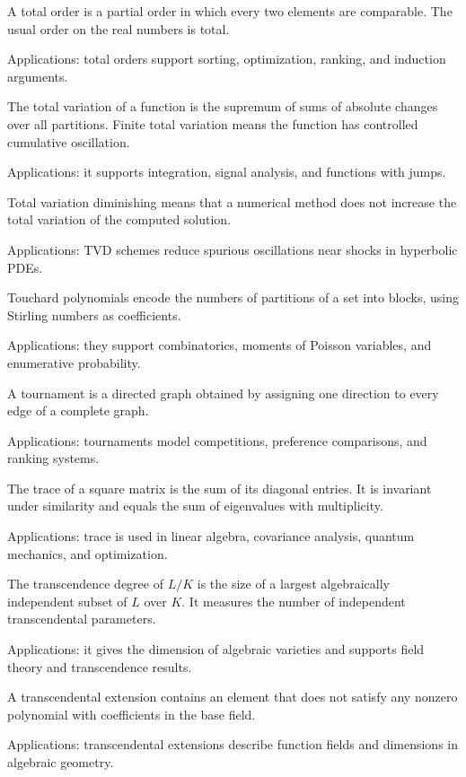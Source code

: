 A total order is a partial order in which every two elements are comparable. The usual order on the real numbers is total. \par\noindent Applications: total orders support sorting, optimization, ranking, and induction arguments.

The total variation of a function is the supremum of sums of absolute changes over all partitions. Finite total variation means the function has controlled cumulative oscillation. \par\noindent Applications: it supports integration, signal analysis, and functions with jumps.

Total variation diminishing means that a numerical method does not increase the total variation of the computed solution. \par\noindent Applications: TVD schemes reduce spurious oscillations near shocks in hyperbolic PDEs.

Touchard polynomials encode the numbers of partitions of a set into blocks, using Stirling numbers as coefficients. \par\noindent Applications: they support combinatorics, moments of Poisson variables, and enumerative probability.

A tournament is a directed graph obtained by assigning one direction to every edge of a complete graph. \par\noindent Applications: tournaments model competitions, preference comparisons, and ranking systems.

The trace of a square matrix is the sum of its diagonal entries. It is invariant under similarity and equals the sum of eigenvalues with multiplicity. \par\noindent Applications: trace is used in linear algebra, covariance analysis, quantum mechanics, and optimization.

The transcendence degree of $L/K$ is the size of a largest algebraically independent subset of $L$ over $K$. It measures the number of independent transcendental parameters. \par\noindent Applications: it gives the dimension of algebraic varieties and supports field theory and transcendence results.

A transcendental extension contains an element that does not satisfy any nonzero polynomial with coefficients in the base field. \par\noindent Applications: transcendental extensions describe function fields and dimensions in algebraic geometry.

